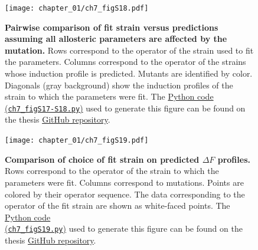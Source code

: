 \documentclass[12pt]{caltech_thesis}
\begin{document}
\hypertarget{fig:KaKi_epAI_pairwise_comparison}{%
\begin{figure}
\centering
\texttt{[image: chapter\_01/ch7\_figS18.pdf]}
\caption[{Pairwise comparison of fit strain versus predictions assuming
all allosteric parameters are affected by the mutation in the inducer
binding domain.}]{\textbf{Pairwise comparison of fit strain versus
predictions assuming all allosteric parameters are affected by the
mutation.} Rows correspond to the operator of the strain used to fit the
parameters. Columns correspond to the operator of the strains whose
induction profile is predicted. Mutants are identified by color.
Diagonals (gray background) show the induction profiles of the strain to
which the parameters were fit. The
\href{https://github.com/gchure/phd/blob/master/src/chapter_07/code/ch7_figS17-S18.py}{Python
code\\
(\texttt{ch7\_figS17-S18.py})} used to generate this figure can be found
on the thesis \href{https://github.com/gchure/phd}{GitHub repository}.}
\label{fig:KaKi_epAI_pairwise_comparison}
\end{figure}
}

\hypertarget{fig:IND_deltaF_comparison}{%
\begin{figure}
\centering
\texttt{[image: chapter\_01/ch7\_figS19.pdf]}
\caption[{Comparison of choice of fit strain on predicted \(\Delta F\)
profiles for inducer binding domain mutants.}]{\textbf{Comparison of
choice of fit strain on predicted \(\Delta F\) profiles.} Rows
correspond to the operator of the strain to which the parameters were
fit. Columns correspond to mutations. Points are colored by their
operator sequence. The data corresponding to the operator of the fit
strain are shown as white-faced points. The
\href{https://github.com/gchure/phd/blob/master/src/chapter_07/code/ch7_figS19.py}{Python
code\\
(\texttt{ch7\_figS19.py})} used to generate this figure can be found on
the thesis \href{https://github.com/gchure/phd}{GitHub repository}.}
\label{fig:IND_deltaF_comparison}
\end{figure}
}
\end{document}
